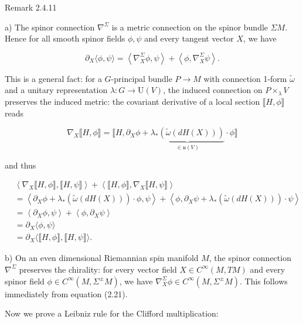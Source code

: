 \documentclass[10pt, letterpaper]{article}
\begin{document}
Remark 2.4.11

a) The spinor connection $\nabla^{\Sigma}$ is a metric connection on the spinor bundle $\Sigma M$. Hence for all smooth spinor fields $\phi, \psi$ and every tangent vector $X$, we have

$$
\partial_{X}\langle\phi, \psi\rangle=\left\langle\nabla_{X}^{\Sigma} \phi, \psi\right\rangle+\left\langle\phi, \nabla_{X}^{\Sigma} \psi\right\rangle .
$$

This is a general fact: for a $G$-principal bundle $P \rightarrow M$ with connection 1-form $\widetilde{\omega}$ and a unitary representation $\lambda: G \rightarrow \mathrm{U}(V)$, the induced connection on $P \times_{\lambda} V$ preserves the induced metric: the covariant derivative of a local section $\llbracket H, \phi \rrbracket$ reads

$$
\nabla_{X} \llbracket H, \phi \rrbracket=\llbracket H, \partial_{X} \phi+\underbrace{\lambda_{*}(\widetilde{\omega}(d H(X)))}_{\in \mathfrak{u}(V)} \cdot \phi \rrbracket
$$

and thus

$$
\begin{aligned}
& \left\langle\nabla_{X} \llbracket H, \phi \rrbracket, \llbracket H, \psi \rrbracket\right\rangle+\left\langle\llbracket H, \phi \rrbracket, \nabla_{X} \llbracket H, \psi \rrbracket\right\rangle \\
& =\left\langle\partial_{X} \phi+\lambda_{*}(\widetilde{\omega}(d H(X))) \cdot \phi, \psi\right\rangle+\left\langle\phi, \partial_{X} \psi+\lambda_{*}(\widetilde{\omega}(d H(X))) \cdot \psi\right\rangle \\
& =\left\langle\partial_{X} \phi, \psi\right\rangle+\left\langle\phi, \partial_{X} \psi\right\rangle \\
& =\partial_{X}\langle\phi, \psi\rangle \\
& =\partial_{X}\langle\llbracket H, \phi \rrbracket, \llbracket H, \psi \rrbracket\rangle .
\end{aligned}
$$

b) On an even dimensional Riemannian spin manifold $M$, the spinor connection $\nabla^{\Sigma}$ preserves the chirality: for every vector field $X \in C^{\infty}(M, T M)$ and every spinor field $\phi \in C^{\infty}\left(M, \Sigma^{ \pm} M\right)$, we have $\nabla_{X}^{\Sigma} \phi \in C^{\infty}\left(M, \Sigma^{ \pm} M\right)$. This follows immediately from equation (2.21).

Now we prove a Leibniz rule for the Clifford multiplication:
\end{document}
